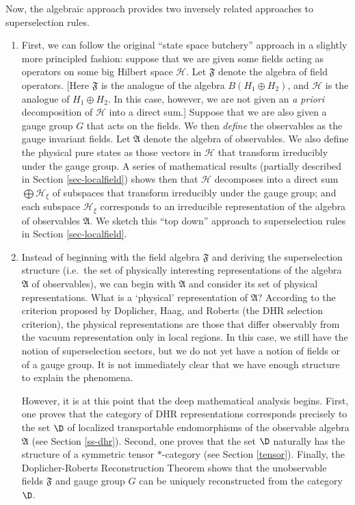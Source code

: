 \documentclass[12pt]{article}
\theoremstyle{definition}
\theoremstyle{definition}
\theoremstyle{remark}
\def\2#1{{\mathcal #1}}
\def\al#1{{\mathfrak #1}}
\begin{document}
Now, the algebraic approach provides two inversely related approaches
to superselection rules.  

\begin{enumerate} \item First, we can follow the original ``state
  space butchery'' approach in a slightly more principled fashion:
  suppose that we are given some fields acting as operators on some
  big Hilbert space $\2H$.  Let $\al F$ denote the algebra of field
  operators.  [Here $\al F$ is the analogue of the algebra $B(H
  _1\oplus H_2)$, and $\2H$ is the analogue of $H_1\oplus H_2$.  In
  this case, however, we are not given an \emph{a priori}
  decomposition of $\2H$ into a direct sum.]  Suppose that we are also
  given a gauge group $G$ that acts on the fields.  We then
  \emph{define} the observables as the gauge invariant fields.  Let
  $\al A$ denote the algebra of observables.  We also define the
  physical pure states as those vectors in $\2H$ that transform
  irreducibly under the gauge group.  A series of mathematical results
  (partially described in Section \ref{sec-localfield}) shows then
  that $\2H$ decomposes into a direct sum $\bigoplus \2H _{\xi}$ of
  subspaces that transform irreducibly under the gauge group; and each
  subspace $\2H _\xi$ corresponds to an irreducible representation of
  the algebra of observables $\al A$.  We sketch this ``top down''
  approach to superselection rules in Section \ref{sec-localfield}.

\item Instead of beginning with the field algebra $\al F$ and deriving
  the superselection structure (i.e.\ the set of physically
  interesting representations of the algebra $\al A$ of observables),
  we can begin with $\al A$ and consider its set of physical
  representations.  What is a `physical' representation of $\al A$?
  According to the criterion proposed by Doplicher, Haag, and Roberts
  (the DHR selection criterion), the physical representations are
  those that differ observably from the vacuum representation only in
  local regions.  In this case, we still have the notion of
  superselection sectors, but we do not yet have a notion of fields or
  of a gauge group.  It is not immediately clear that we have enough
  structure to explain the phenomena.

  However, it is at this point that the deep mathematical analysis
  begins.  First, one proves that the category of DHR representations
  corresponds precisely to the set $\D$ of localized transportable
  endomorphisms of the observable algebra $\al A$ (see Section
  \ref{ss-dhr}).  Second, one proves that the set $\D$ naturally has
  the structure of a symmetric tensor $*$-category (see Section
  \ref{tensor}).  Finally, the Doplicher-Roberts Reconstruction
  Theorem shows that the unobservable fields $\al F$ and gauge group
  $G$ can be uniquely reconstructed from the category
  $\D$. \end{enumerate}
\end{document}
